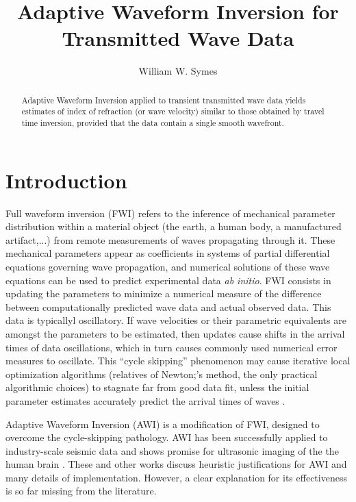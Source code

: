 \title{Adaptive Waveform Inversion for Transmitted Wave Data}
\author{William W. Symes}

\begin{abstract}
Adaptive Waveform Inversion
applied to transient transmitted wave data yields estimates of index of
refraction (or wave velocity) similar to those obtained by travel time
inversion, provided that the data contain a single smooth wavefront.
\end{abstract}

\section{Introduction}
Full waveform inversion (FWI) refers to the inference of mechanical
parameter distribution within a material object  (the earth, a human
body, a manufactured artifact,...) from remote measurements of waves
propagating through it. These mechanical parameters appear as
coefficients in systems of partial differential equations governing
wave propagation, and numerical solutions of these wave equations can
be used to predict experimental data {\em ab initio}. FWI consists in
updating the parameters to minimize a numerical measure of  the difference between computationally
predicted wave data and actual observed
data. This data is typicallyl oscillatory. If wave velocities or their parametric equivalents are amongst the parameters
to be estimated, then updates cause shifts in the arrival times of
data oscillations, which in turn causes commonly used numerical error measures
to oscillate. This ``cycle skipping'' phenomenon may cause iterative local optimization algorithms (relatives of
Newton;'s method, the only practical algorithmic choices) to stagnate
far from good data fit, unless the initial
parameter estimates accurately predict the arrival times of waves \cite[]{GauTarVir:86,VirieuxOperto:09,HuetalIEEE:18}.

Adaptive Waveform
Inversion \cite[]{Warner:16} (AWI) is a modification of FWI, designed to overcome the
cycle-skipping pathology. AWI has been successfully applied to
industry-scale seismic data
\cite[]{GuaschWarnerRavaut:GEO19,Warneretal:SEG21} and shows promise
for ultrasonic imaging of the the human brain
\cite[]{Guaschetal:NPJDM20}. These and other works discuss heuristic justifications for AWI
and many details of implementation. However, a clear explanation for its
effectiveness is so far missing from the literature.

